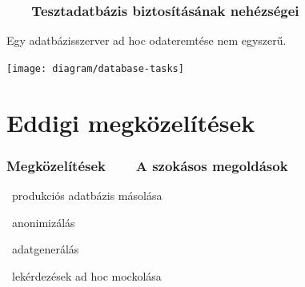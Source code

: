 \documentclass[
    aspectratio=169,
]{beamer}
\newcommand{\slidetitle}[2]{\frametitle{{\small #1 ~ \ding{226} ~ } \normalsize \textbf{#2} }}
\begin{document}
\begin{frame}
    \slidetitle{\sectionshorttitle}{Tesztadatbázis biztosításának nehézségei}
    
    Egy adatbázisszerver ad hoc odateremtése nem egyszerű.
    
    \vspace{1.5em}

    \centering
    
    \texttt{[image: diagram/database-tasks]}
\end{frame}

\section{Eddigi megközelítések}
\def\sectionshorttitle{Megközelítések}

\begin{frame}
    \slidetitle{\sectionshorttitle}{A szokásos megoldások}
    
    \begin{logolist}
        \setlength\itemsep{1.5em}
        \LARGE
        \item[\raisebox{-0.4em}{}]
                ~produkciós adatbázis másolása
        \item[\raisebox{-0.4em}{}]
                ~anonimizálás
        \item[\raisebox{-0.4em}{}]
                ~adatgenerálás
        \item[\raisebox{-0.4em}{}]
                ~lekérdezések ad hoc mockolása
    \end{logolist}
\end{frame}
\end{document}
